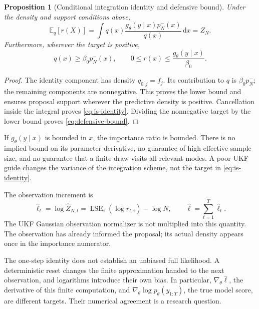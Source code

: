 \documentclass[11pt,a4paper]{article}
\newcommand{\E}{\mathbb E}
\newcommand{\dd}{\mathrm d}
\newcommand{\lse}{\operatorname{LSE}}
\newtheorem{proposition}{Proposition}[section]
\begin{document}
\begin{proposition}[Conditional integration identity and defensive bound]
Under the density and support conditions above,
\begin{equation}
\label{eq:is-identity}
 \E_q[r(X)]
 =\int q(x)\frac{g_\theta(y\mid x)p_N^-(x)}{q(x)}\,\dd x
 =Z_N .
\end{equation}
Furthermore, wherever the target is positive,
\begin{equation}
\label{eq:defensive-bound}
 q(x)\geq\beta_0p_N^-(x),\qquad
 0\leq r(x)\leq\frac{g_\theta(y\mid x)}{\beta_0}.
\end{equation}
\end{proposition}
\begin{proof}
The identity component has density \(q_{0,j}=f_j\). Its contribution to
\(q\) is \(\beta_0p_N^-\); the remaining components are nonnegative.
This proves the lower bound and ensures proposal support wherever the
predictive density is positive. Cancellation inside the integral proves
\eqref{eq:is-identity}. Dividing the nonnegative target by the lower
bound proves \eqref{eq:defensive-bound}.
\end{proof}

If \(g_\theta(y\mid x)\) is bounded in \(x\), the importance ratio is
bounded. There is no implied bound on its parameter derivative, no
guarantee of high effective sample size, and no guarantee that a finite
draw visits all relevant modes. A poor UKF guide changes the variance of
the integration scheme, not the target in \eqref{eq:is-identity}.

The observation increment is
\begin{equation}
\label{eq:log-increment}
 \widehat\ell_t
 =\log\widehat Z_{N,t}
 =\lse_i(\log r_{t,i})-\log N,\qquad
 \widehat\ell=\sum_{t=1}^T\widehat\ell_t.
\end{equation}
The UKF Gaussian observation normalizer is not multiplied into this
quantity. The observation has already informed the proposal; its actual
density appears once in the importance numerator.

The one-step identity does not establish an unbiased full likelihood.
A deterministic reset changes the finite approximation handed to the
next observation, and logarithms introduce their own bias. In particular,
\(\nabla_\theta\widehat\ell\), the derivative of this finite computation,
and \(\nabla_\theta\log p_\theta(y_{1:T})\), the true model score, are
different targets. Their numerical agreement is a research question.
\end{document}
